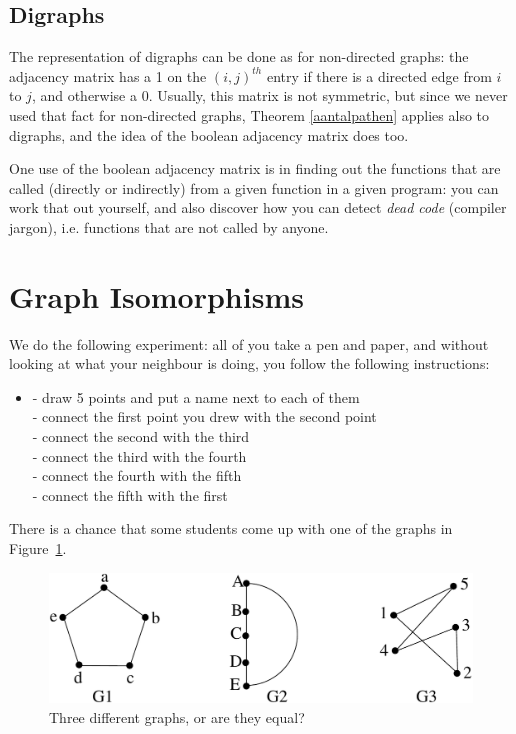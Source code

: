 \subsection{Digraphs}
The representation of digraphs can be done as for non-directed graphs:
the adjacency matrix has a 1 on the $(i,j)^{th}$ entry if there is a
directed edge from $i$ to $j$, and otherwise a 0. Usually, this matrix
is not symmetric, but since we never used that fact for non-directed
graphs, Theorem \ref{aantalpathen} applies also to digraphs, and the
idea of the boolean adjacency matrix does too.

One use of the boolean adjacency matrix is in finding out the
functions that are called (directly or indirectly) from a given
function in a given program: you can work that out yourself, and also
discover how you can detect {\em dead code} (compiler jargon),
i.e. functions that are not called by anyone. 


\section{Graph Isomorphisms}

We do the following experiment: all of you take a pen and paper, and
without looking at what your neighbour is doing, you follow the
following instructions:

\begin{itemize}
\item[]
- draw 5 points and put a name next to each of them \\
- connect the first point you drew with the second point\\
- connect the second with the third\\
- connect the third with the fourth\\
- connect the fourth with the fifth\\
- connect the fifth with the first\\
\end{itemize}

There is a chance that some students come up with one of the graphs in
Figure~\ref{experiment1}.

\begin{figure}[ht]
	\centering
	\includegraphics[width=0.6\linewidth,keepaspectratio]{experiment1}
	\caption{Three different graphs, or are they equal?\label{experiment1}}
\end{figure}

